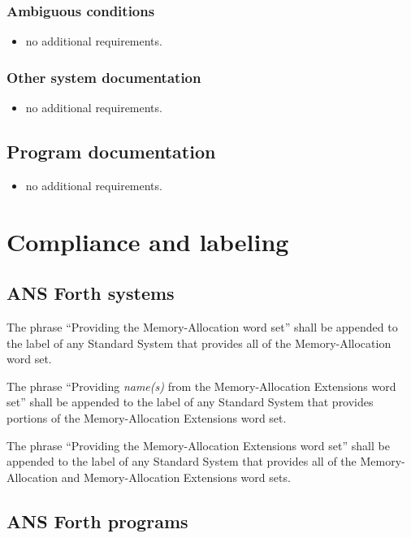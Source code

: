 \subsubsection{Ambiguous conditions} %
\begin{itemize}
\item no additional requirements.
\end{itemize}

\subsubsection{Other system documentation} %
\begin{itemize}
\item no additional requirements.
\end{itemize}

\subsection{Program documentation} %
\begin{itemize}
\item no additional requirements.
\end{itemize}

\section{Compliance and labeling} %

\subsection{ANS Forth systems} %

The phrase ``Providing the Memory-Allocation word set'' shall be
appended to the label of any Standard System that provides all of
the Memory-Allocation word set.

The phrase ``Providing \emph{name(s)} from the Memory-Allocation
Extensions word set'' shall be appended to the label of any Standard
System that provides portions of the Memory-Allocation Extensions
word set.

The phrase ``Providing the Memory-Allocation Extensions word set''
shall be appended to the label of any Standard System that provides
all of the Memory-Allocation and Memory-Allocation Extensions word
sets.

\subsection{ANS Forth programs} %

